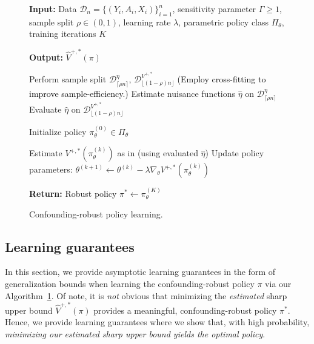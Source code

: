 \documentclass{article} %
\theoremstyle{plain}
\theoremstyle{definition}
\theoremstyle{remark}
\newcommand{\rebuttal}[1]{\textcolor{black}{#1}}
\begin{document}
\begin{figure}
\begin{minipage}{0.4\textwidth}
\vspace{-1.5cm} %
\begin{algorithm}[H]
{\small
\textbf{Input:} Data $\mathcal{D}_n=\{(Y_i,A_i,X_i)\}_{i=1}^n$, sensitivity parameter ${\Gamma\geq 1}$, sample split $\rho\in(0,1)$, learning rate $\lambda$,
parametric policy class $\Pi_\theta$, training iterations $K$ 

\vspace{1mm}
\textbf{Output:} $\hat{V}^{+,*}(\pi)$
}
{\small
\begin{algorithmic}[1]
\STATE Perform sample split $\mathcal{D}_{\lceil \rho n\rceil}^\eta$, $\mathcal{D}_{\lfloor (1-\rho) n\rfloor}^{V^{+,*}}$ \rebuttal{(Employ cross-fitting to improve sample-efficiency.)}
\STATE Estimate nuisance functions $\hat{\eta}$ on $\mathcal{D}_{\lceil \rho n\rceil}^\eta$
\STATE Evaluate $\hat{\eta}$ on $\mathcal{D}_{\lfloor (1-\rho) n\rfloor}^{V^{+,*}}$

\STATE Initialize policy $\pi_\theta^{(0)}\in\Pi_\theta$

    \STATE Estimate $V^{+,*}(\pi_\theta^{(k)})$ as in  (using evaluated $\hat{\eta}$)
    \STATE Update policy parameters:%
    \STATE \quad $\theta^{(k+1)} \gets \theta^{(k)} - \lambda \nabla_\theta V^{+,*}(\pi_\theta^{(k)})$
\ENDFOR

\STATE \textbf{Return:} Robust policy $\pi^* \gets \pi_\theta^{(K)}$
\end{algorithmic}
}
\caption{Confounding-robust policy learning.}\label{algorithm:training}
\end{algorithm}
\vspace{-1.2cm} %
\end{minipage}
\end{figure}


\subsection{Learning guarantees}\label{sec:improvement_guarantee}
In this section, we provide asymptotic learning guarantees in the form of generalization bounds when learning the confounding-robust policy $\pi$ via our Algorithm~\ref{algorithm:training}. Of note, it is \emph{not} obvious that minimizing the \emph{estimated} sharp upper bound $\hat{V}^{+,*}(\pi)$ provides a meaningful, confounding-robust policy $\pi^*$. Hence, we provide learning guarantees where we show that, with high probability, \emph{minimizing our estimated sharp upper bound yields the optimal policy}.
\end{document}
